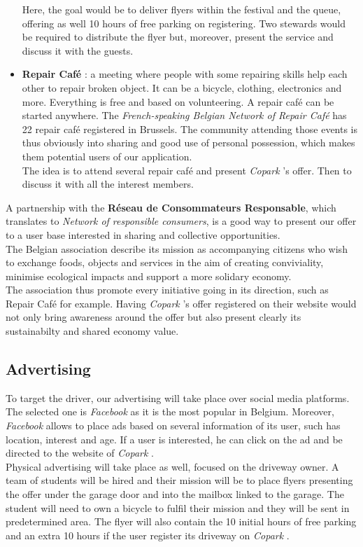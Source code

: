 \documentclass[12pt,a4paper,oneside]{book}
\newcommand{\bp}{\textit{Copark }}
\begin{document}
\begin{itemize}
Here, the goal would be to deliver flyers within the festival and the queue, offering as well 10 hours of free parking on registering. Two stewards would be required to distribute the flyer but, moreover, present the service and discuss it with the guests.
\item \textbf{Repair Café} : a meeting where people with some repairing skills help each other to repair broken object. It can be a bicycle, clothing, electronics and more. Everything is free and based on volunteering. A repair café can be started anywhere. The \textit{French-speaking Belgian Network of Repair Café} has 22 repair café registered in Brussels.\cite{repair} The community attending those events is thus obviously into sharing and good use of personal possession, which makes them potential users of our application.\\
The idea is to attend several repair café and present \bp's offer. Then to discuss it with all the interest members.
\end{itemize}

A partnership with the \textbf{Réseau de Consommateurs Responsable}, which translates to \textit{Network of responsible consumers}, is a good way to present our offer to a user base interested in sharing and collective opportunities.\\
The Belgian association describe its mission as accompanying citizens who wish to exchange foods, objects and services in the aim of creating conviviality, minimise ecological impacts and support a more solidary economy.\cite{rcr}\\
The association thus promote every initiative going in its direction, such as Repair Café for example. Having \bp's offer registered on their website would not only bring awareness around the offer but also present clearly its sustainabilty and shared economy value.

\subsection{Advertising}
To target the driver, our advertising will take place over social media platforms. The selected one is \textit{Facebook} as it is the most popular in Belgium.\cite{smstat} Moreover, \textit{Facebook} allows to place ads based on several information of its user, such has location, interest and age. If a user is interested, he can click on the ad and be directed to the website of \bp.\\

Physical advertising will take place as well, focused on the driveway owner. A team of students will be hired and their mission will be to place flyers presenting the offer under the garage door and into the mailbox linked to the garage. The student will need to own a bicycle to fulfil their mission and they will be sent in predetermined area. The flyer will also contain the 10 initial hours of free parking and an extra 10 hours if the user register its driveway on \bp.\\
\end{document}
